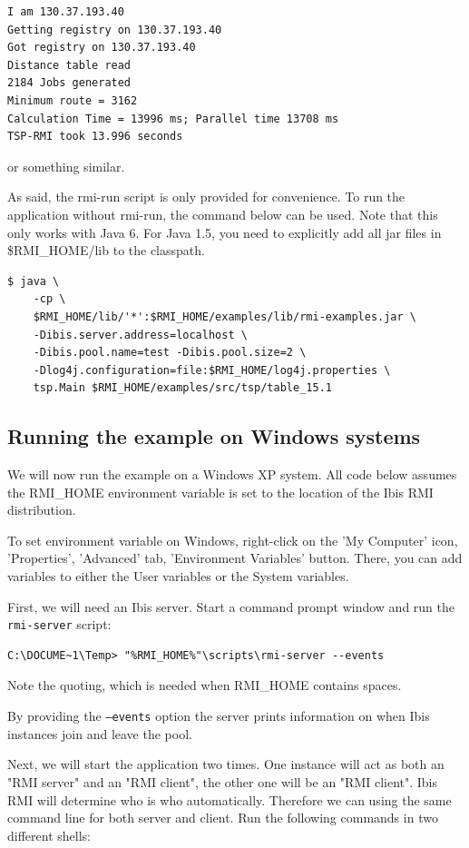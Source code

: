 \documentclass[a4paper,10pt]{article}
\begin{document}
\noindent
{\small
\begin{verbatim}
I am 130.37.193.40
Getting registry on 130.37.193.40
Got registry on 130.37.193.40
Distance table read
2184 Jobs generated
Minimum route = 3162
Calculation Time = 13996 ms; Parallel time 13708 ms
TSP-RMI took 13.996 seconds
\end{verbatim}
}
\noindent

or something similar.

As said, the rmi-run script is only provided for convenience. To run
the application without rmi-run, the command below can be used.
Note that this only works with Java 6. For Java 1.5, you need to
explicitly add all jar files in \$RMI\_HOME/lib to the classpath.

\noindent
{\small
\begin{verbatim}
$ java \
    -cp \
    $RMI_HOME/lib/'*':$RMI_HOME/examples/lib/rmi-examples.jar \
    -Dibis.server.address=localhost \
    -Dibis.pool.name=test -Dibis.pool.size=2 \
    -Dlog4j.configuration=file:$RMI_HOME/log4j.properties \
    tsp.Main $RMI_HOME/examples/src/tsp/table_15.1
\end{verbatim}
}
\noindent

\subsection{Running the example on Windows systems}

We will now run the example on a Windows XP system.
All code below assumes the RMI\_HOME
environment variable is set to the location of the Ibis RMI distribution.

To set environment variable on Windows, right-click on the 'My Computer' icon,
'Properties', 'Advanced' tab, 'Environment Variables' button. There, you
can add variables to either the User variables or the System variables.

First, we will need an Ibis server. Start a command prompt window and
run the \texttt{rmi-server} script:
\noindent
{\small
\begin{verbatim}
C:\DOCUME~1\Temp> "%RMI_HOME%"\scripts\rmi-server --events
\end{verbatim}
}
\noindent

Note the quoting, which is needed when RMI\_HOME contains spaces.

By providing the \texttt{--events} option the server
prints information on when Ibis instances join and leave the pool.

Next, we will start the application two times. One instance will act as both an
"RMI server" and an "RMI client", the other one will be an "RMI client".
Ibis RMI will determine who is who automatically. Therefore we can using the
same command line for both server and client.
Run the following commands in two different shells:
\end{document}
